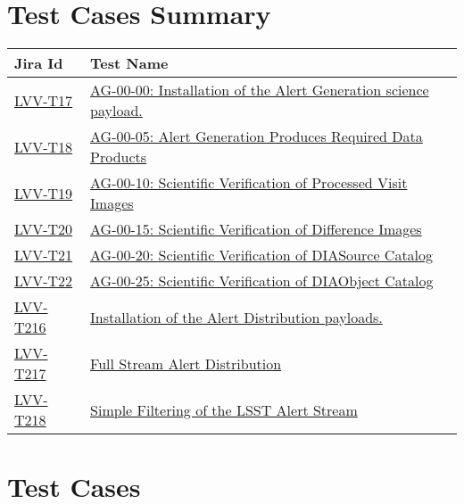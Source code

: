 \section{Test Cases Summary}\label{test-cases-summary}

\begin{longtable}[]{p{3cm}p{13cm}}
\toprule
Jira Id & Test Name\tabularnewline
\midrule
\endhead
\protect\hyperlink{lvv-t17---ag-00-00-installation-of-the-alert-generation-science-payload}{LVV-T17}
&
\href{https://jira.lsstcorp.org/secure/Tests.jspa\#/testCase/LVV-T17}{AG-00-00:
Installation of the Alert Generation science payload.}\tabularnewline
\protect\hyperlink{lvv-t18---ag-00-05-alert-generation-produces-required-data-products}{LVV-T18}
&
\href{https://jira.lsstcorp.org/secure/Tests.jspa\#/testCase/LVV-T18}{AG-00-05:
Alert Generation Produces Required Data Products}\tabularnewline
\protect\hyperlink{lvv-t19---ag-00-10-scientific-verification-of-processed-visit-images}{LVV-T19}
&
\href{https://jira.lsstcorp.org/secure/Tests.jspa\#/testCase/LVV-T19}{AG-00-10:
Scientific Verification of Processed Visit Images}\tabularnewline
\protect\hyperlink{lvv-t20---ag-00-15-scientific-verification-of-difference-images}{LVV-T20}
&
\href{https://jira.lsstcorp.org/secure/Tests.jspa\#/testCase/LVV-T20}{AG-00-15:
Scientific Verification of Difference Images}\tabularnewline
\protect\hyperlink{lvv-t21---ag-00-20-scientific-verification-of-diasource-catalog}{LVV-T21}
&
\href{https://jira.lsstcorp.org/secure/Tests.jspa\#/testCase/LVV-T21}{AG-00-20:
Scientific Verification of DIASource Catalog}\tabularnewline
\protect\hyperlink{lvv-t22---ag-00-25-scientific-verification-of-diaobject-catalog}{LVV-T22}
&
\href{https://jira.lsstcorp.org/secure/Tests.jspa\#/testCase/LVV-T22}{AG-00-25:
Scientific Verification of DIAObject Catalog}\tabularnewline
\protect\hyperlink{lvv-t216---installation-of-the-alert-distribution-payloads}{LVV-T216}
&
\href{https://jira.lsstcorp.org/secure/Tests.jspa\#/testCase/LVV-T216}{Installation
of the Alert Distribution payloads.}\tabularnewline
\protect\hyperlink{lvv-t217---full-stream-alert-distribution}{LVV-T217}
&
\href{https://jira.lsstcorp.org/secure/Tests.jspa\#/testCase/LVV-T217}{Full
Stream Alert Distribution}\tabularnewline
\protect\hyperlink{lvv-t218---simple-filtering-of-the-lsst-alert-stream}{LVV-T218}
&
\href{https://jira.lsstcorp.org/secure/Tests.jspa\#/testCase/LVV-T218}{Simple
Filtering of the LSST Alert Stream}\tabularnewline
\bottomrule
\end{longtable}

\section{Test Cases}\label{test-cases}

